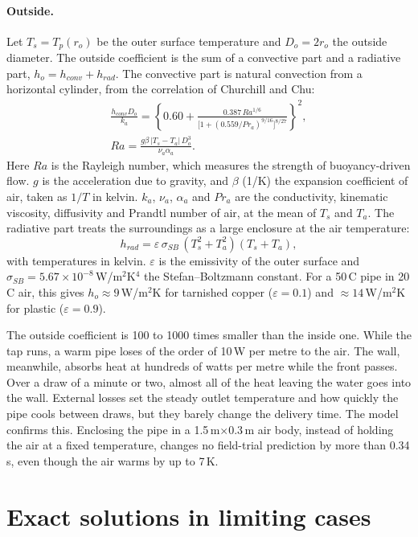 \documentclass[a4paper,justified]{tufte-handout}
\newcommand{\degC}{\,\textdegree{}C}
\begin{document}
\paragraph{Outside.} Let $T_s=T_p(r_o)$ be the outer surface temperature and
$D_o=2r_o$ the outside diameter. The outside coefficient is the sum of a
convective part and a radiative part, $h_o=h_{conv}+h_{rad}$. The convective
part is natural convection from a horizontal cylinder, from the correlation of
Churchill and Chu:
\begin{gather}
  \frac{h_{conv}D_o}{k_a}
  = \left\{0.60+\frac{0.387\,Ra^{1/6}}{\bigl[1+(0.559/Pr_a)^{9/16}\bigr]^{8/27}}\right\}^{2},\\
  Ra=\frac{g\beta\,|T_s-T_a|\,D_o^3}{\nu_a\alpha_a}.
\end{gather}
Here $Ra$ is the Rayleigh number, which measures the strength of buoyancy-driven
flow. $g$ is the acceleration due to gravity, and $\beta$ (1/K) the
expansion coefficient of air, taken as $1/T$ in kelvin. $k_a$, $\nu_a$,
$\alpha_a$ and $Pr_a$ are the conductivity, kinematic viscosity, diffusivity and
Prandtl number of air, at the mean of $T_s$ and $T_a$. The radiative part treats
the surroundings as a large enclosure at the air temperature:
\begin{equation}
  h_{rad}=\varepsilon\,\sigma_{SB}\,(T_s^2+T_a^2)(T_s+T_a),
\end{equation}
with temperatures in kelvin. $\varepsilon$ is the emissivity of the outer
surface and $\sigma_{SB}=5.67\times10^{-8}$\,W/m$^2$K$^4$ the Stefan--Boltzmann
constant. For a 50\degC{} pipe in 20\degC{} air, this gives
$h_o\approx9$\,W/m$^2$K for tarnished copper ($\varepsilon=0.1$) and
$\approx14$\,W/m$^2$K for plastic ($\varepsilon=0.9$).

The outside coefficient is 100 to 1000 times smaller than the inside one. While
the tap runs, a warm pipe loses of the order of 10\,W per metre to the air. The
wall, meanwhile, absorbs heat at hundreds of watts per metre while the front
passes. Over a draw of a minute or two, almost all of the heat leaving the water
goes into the wall. External losses set the steady outlet temperature and how
quickly the pipe cools between draws, but they barely change the delivery time.
The model confirms this. Enclosing the pipe in a 1.5\,m$\times$0.3\,m air body,
instead of holding the air at a fixed temperature, changes no field-trial
prediction by more than 0.34\,s, even though the air warms by up to 7\,K.

\section{Exact solutions in limiting cases}
\end{document}
